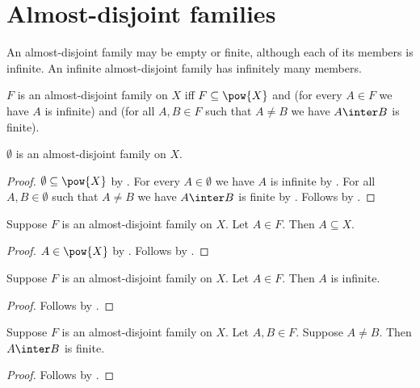 \section{Almost-disjoint families}




An almost-disjoint family may be empty or finite, although each of its members
is infinite. An infinite almost-disjoint family has infinitely many members.

\begin{definition}\label{almost_disjoint_family_on}
    $F$ is an almost-disjoint family on $X$ iff
        $F\subseteq\pow{X}$ and
        (for every $A\in F$ we have $A$ is infinite) and
        (for all $A,B\in F$ such that $A\neq B$
            we have $A\inter B$ is finite).
\end{definition}

\begin{proposition}\label{empty_is_almost_disjoint_family}
    $\emptyset$ is an almost-disjoint family on $X$.
\end{proposition}
\begin{proof}
    $\emptyset\subseteq\pow{X}$ by .
    For every $A\in\emptyset$ we have $A$ is infinite by
        .
    For all $A,B\in\emptyset$ such that $A\neq B$ we have
        $A\inter B$ is finite by .
    Follows by .
\end{proof}

\begin{proposition}\label{almost_disjoint_members_subset}
    Suppose $F$ is an almost-disjoint family on $X$.
    Let $A\in F$.
    Then $A\subseteq X$.
\end{proposition}
\begin{proof}
    $A\in\pow{X}$
        by .
    Follows by .
\end{proof}

\begin{proposition}\label{almost_disjoint_members_infinite}
    Suppose $F$ is an almost-disjoint family on $X$.
    Let $A\in F$.
    Then $A$ is infinite.
\end{proposition}
\begin{proof}
    Follows by .
\end{proof}

\begin{proposition}\label{almost_disjoint_distinct_intersection_finite}
    Suppose $F$ is an almost-disjoint family on $X$.
    Let $A,B\in F$.
    Suppose $A\neq B$.
    Then $A\inter B$ is finite.
\end{proposition}
\begin{proof}
    Follows by .
\end{proof}


